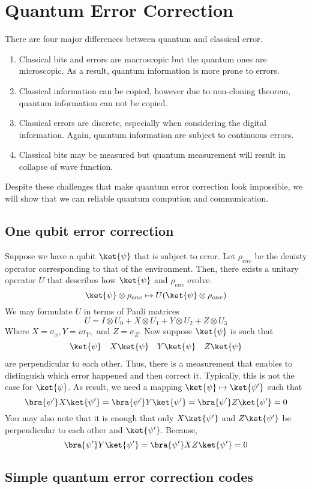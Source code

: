 \chapter{Quantum Error Correction}
There are four major differences between quantum and classical error.

\begin{enumerate}
    \item Classical bits and errors are macroscopic but the quantum ones are microscopic. As a result, quantum information is more prone to errors.
    \item Classical information can be copied, however due to non-cloning theorem, quantum information can not be copied.
    \item Classical errors are discrete, especially when considering the digital information. Again, quantum information are subject to continuous errors.
    \item Classical bits may be measured but quantum measurement will result in collapse of wave function. 
\end{enumerate}
Despite these challenges that make quantum error correction look impossible, we will show that we can reliable quantum compution and communication.

\section{One qubit error correction}
Suppose we have a qubit \(\ket{\psi}\) that is subject to error. Let \(\rho_{env}\) be the denisty operator corresponding to that of the environment. Then, there exists a unitary operator \(U\) that describes how \(\ket{\psi}\) and \(\rho_{env}\) evolve.
\begin{equation*}
    \ket{\psi}\otimes \rho_{env} \mapsto U(\ket{\psi}\otimes \rho_{env})
\end{equation*}
We may formulate \(U\) in terms of Pauli matrices
\begin{equation*}
    U = I \otimes U_0 + X \otimes U_1 + Y \otimes U_2 + Z \otimes U_3
\end{equation*}
Where \(X= \sigma_x, Y = i\sigma_Y,\) and \(Z = \sigma_Z\). Now suppose \(\ket{\psi}\) is such that 
\begin{align*}
    \ket{\psi} && X \ket{\psi} && Y\ket{\psi} && Z\ket{\psi}
\end{align*}
are perpendicular to each other. Thus, there is a measurement that enables to distinguish which error happened and then correct it. Typically, this is not the case for \(\ket{\psi}\). As result, we need a mapping \(\ket{\psi} \mapsto \ket{\psi'}\) such that 
\begin{equation*}
    \bra{\psi'}X \ket{\psi'} = \bra{\psi'}Y \ket{\psi'} = \bra{\psi'}Z\ket{\psi'} = 0
\end{equation*}
You may also note that it is enough that only \(X\ket{\psi'}\) and \(Z\ket{\psi'}\) be perpendicular to each other and \(\ket{\psi'}\). Because,
\begin{equation*}
    \bra{\psi'}Y\ket{\psi'} = \bra{\psi'}XZ\ket{\psi'} = 0
\end{equation*}
\section{Simple quantum error correction codes}

